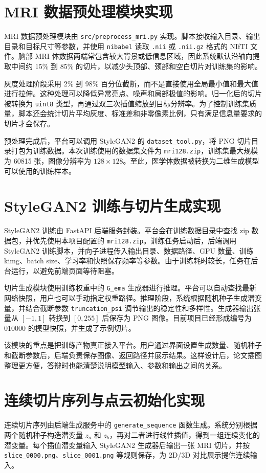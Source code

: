 \section{MRI 数据预处理模块实现}
MRI 数据预处理模块由 \texttt{src/preprocess\_mri.py} 实现。脚本接收输入目录、输出目录和目标尺寸等参数，并使用 \texttt{nibabel} 读取 \texttt{.nii} 或 \texttt{.nii.gz} 格式的 NIfTI 文件。脑部 MRI 体数据两端常包含较大背景或低信息区域，因此系统默认沿轴向提取中间约 15\% 到 85\% 的切片，以减少头顶部、颈部和空白切片对训练集的影响。

灰度处理阶段采用 2\% 到 98\% 百分位截断，而不是直接使用全局最小值和最大值进行拉伸。这种处理可以降低异常亮点、噪声和局部极值的影响。归一化后的切片被转换为 \texttt{uint8} 类型，再通过双三次插值缩放到目标分辨率。为了控制训练集质量，脚本还会统计切片平均灰度、标准差和非零像素比例，只有满足信息量要求的切片才会保存。

预处理完成后，平台可以调用 StyleGAN2 的 \texttt{dataset\_tool.py}，将 PNG 切片目录打包为训练数据。本次训练使用的数据集文件为 \texttt{mri128.zip}，训练集最大规模为 60815 张，图像分辨率为 $128\times128$。至此，医学体数据被转换为二维生成模型可以使用的训练样本。

\section{StyleGAN2 训练与切片生成实现}
StyleGAN2 训练由 FastAPI 后端服务封装。平台会在训练数据目录中查找 zip 数据包，并优先使用本项目配置的 \texttt{mri128.zip}。训练任务启动后，后端调用 StyleGAN2 训练脚本，并向子进程传入输出目录、数据路径、GPU 数量、训练 kimg、batch size、学习率和快照保存频率等参数。由于训练耗时较长，任务在后台运行，以避免前端页面等待阻塞。

切片生成模块使用训练权重中的 \texttt{G\_ema} 生成器进行推理。平台可以自动查找最新网络快照，用户也可以手动指定权重路径。推理阶段，系统根据随机种子生成潜变量，并结合截断参数 \texttt{truncation\_psi} 调节输出的稳定性和多样性。生成器输出张量从 $[-1,1]$ 转换到 $[0,255]$ 后保存为 PNG 图像。目前项目已经形成编号为 010000 的模型快照，并生成了示例切片。

该模块的重点是把训练产物真正接入平台。用户通过界面设置生成数量、随机种子和截断参数后，后端负责保存图像、返回路径并展示结果。这样设计后，论文插图整理更方便，答辩时也能清楚说明模型输入、参数和输出之间的关系。

\section{连续切片序列与点云初始化实现}
连续切片序列由后端生成服务中的 \texttt{generate\_sequence} 函数生成。系统分别根据两个随机种子构造潜变量 $z_a$ 和 $z_b$，再对二者进行线性插值，得到一组连续变化的潜变量。每个插值潜变量输入 StyleGAN2 生成器后输出一张 MRI 切片，并按 \texttt{slice\_0000.png}、\texttt{slice\_0001.png} 等规则保存，为 2D/3D 对比展示提供连续输入。

